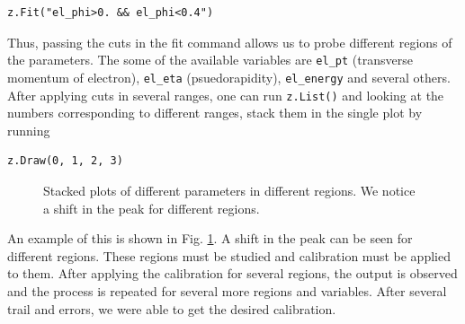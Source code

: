 \documentclass[a4paper]{report}
\numberwithin{equation}{section}
\begin{document}
\begin{verbatim}
z.Fit("el_phi>0. && el_phi<0.4")
\end{verbatim}
Thus, passing the cuts in the fit command allows us to probe different regions of the parameters. The some of the available variables are \texttt{el\_pt} (transverse momentum of electron), \texttt{el\_eta} (psuedorapidity), \texttt{el\_energy} and several others. After applying cuts in several ranges, one can run \texttt{z.List()} and looking at the numbers corresponding to different ranges, stack them in the single plot by running

\begin{verbatim}
z.Draw(0, 1, 2, 3)
\end{verbatim}

\begin{figure}[htb!]
	\centering
	\quad
	\centering
	\caption{Stacked plots of different parameters in different regions. We notice a shift in the peak for different regions.}
	\label{fig:region-stack}
\end{figure}

An example of this is shown in Fig. \ref{fig:region-stack}. A shift in the peak can be seen for different regions. These regions must be studied and calibration must be applied to them. After applying the calibration for several regions, the output is observed and the process is repeated for several more regions and variables. After several trail and errors, we were able to get the desired calibration. 
\end{document}
